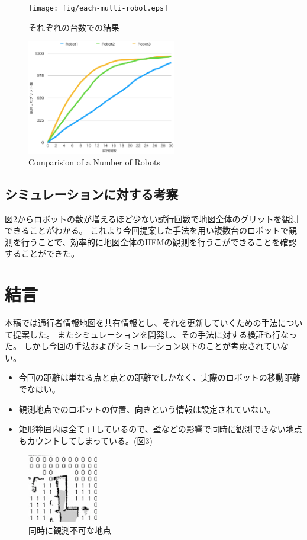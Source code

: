 \documentclass{jsarticle}
\begin{document}
\begin{figure}[tbh]
 \centering
  \texttt{[image: fig/each-multi-robot.eps]}
  \vspace*{-4mm}
  \caption{それぞれの台数での結果}
  \label{fig: each-multirobot}
\end{figure}

\begin{figure}[tbh]
 \centering
  \includegraphics[height=50mm]{fig/multi-robot.eps}
  \vspace*{-4mm}
  \caption{Comparision of a Number of Robots}
  \label{fig: multirobot}
\end{figure}


\subsection{シミュレーションに対する考察}
図\ref{fig: multirobot}からロボットの数が増えるほど少ない試行回数で地図全体のグリットを観測できることがわかる。
これより今回提案した手法を用い複数台のロボットで観測を行うことで、効率的に地図全体のHFMの観測を行うこができることを確認することができた。




\section{結言}
本稿では通行者情報地図を共有情報とし、それを更新していくための手法について提案した。
またシミュレーションを開発し、その手法に対する検証も行なった。
しかし今回の手法およびシミュレーション以下のことが考慮されていない。
\begin{itemize}
  \item 今回の距離は単なる点と点との距離でしかなく、実際のロボットの移動距離でなはい。
  \item 観測地点でのロボットの位置、向きという情報は設定されていない。
  \item 矩形範囲内は全て+1しているので、壁などの影響で同時に観測できない地点もカウントしてしまっている。(図\ref{fig: impossible})
\end{itemize}
\begin{figure}[tbh]
 \centering
  \includegraphics[height=30mm]{fig/impossible.eps}
  \vspace*{-4mm}
  \caption{同時に観測不可な地点}
  \label{fig: impossible}
\end{figure}
\end{document}
